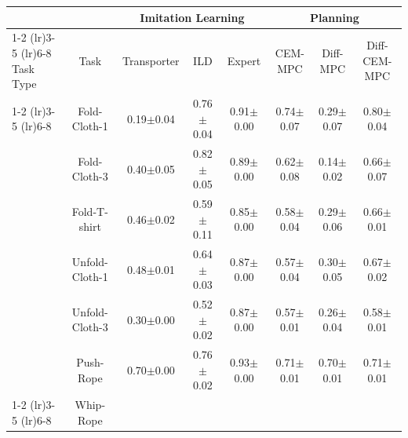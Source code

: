 \begin{table}[t]
\centering
\fontsize{7.5}{7.5}\selectfont
\begin{tabular}{lccccccc}
\toprule
 &  & \multicolumn{3}{c}{Imitation Learning} &  \multicolumn{3}{c}{Planning}\\
 \cmidrule(lr){1-2}
 \cmidrule(lr){3-5} 
\cmidrule(lr){6-8} 
Task Type   
& Task & Transporter & ILD & Expert
 & CEM-MPC & Diff-MPC & Diff-CEM-MPC\\
\cmidrule(lr){1-2}
\cmidrule(lr){3-5} 
\cmidrule(lr){6-8} 
\multirow{6}{*}{High-level} 

& Fold-Cloth-1 

& 0.19$\pm$0.04 & 0.76$\pm$0.04 & 0.91$\pm$0.00

&0.74$\pm$0.07 & 0.29$\pm$0.07 &0.80$\pm$0.04 
\\


& Fold-Cloth-3 

& 0.40$\pm$0.05 &   0.82$\pm$0.05 & 0.89$\pm$0.00

& 0.62$\pm$0.08 & 0.14$\pm$0.02 & 0.66$\pm$0.07 

\\


& Fold-T-shirt 

& 0.46$\pm$0.02 &  0.59$\pm$0.11 & 0.85$\pm$0.00 

& 0.58$\pm$0.04 & 0.29$\pm$0.06 & 0.66$\pm$0.01

\\


& Unfold-Cloth-1 

 &0.48$\pm$0.01 & 0.64$\pm$0.03 & 0.87$\pm$0.00
 
 &  0.57$\pm$0.04 & 0.30$\pm$0.05 & 0.67$\pm$0.02  


\\


&Unfold-Cloth-3 

 & 0.30$\pm$0.00 & 0.52$\pm$0.02 &0.87$\pm$0.00
 
 & 0.57$\pm$0.01 & 0.26$\pm$0.04 & 0.58$\pm$0.01 

\\

& Push-Rope

&  0.70$\pm$0.00 & 0.76$\pm$0.02 & 0.93$\pm$0.00 

& 0.71$\pm$0.01 & 0.70$\pm$0.01 &0.71$\pm$0.01  

\\
\cmidrule(lr){1-2}
\cmidrule(lr){3-5} 
\cmidrule(lr){6-8}
\multirow{3}{*}{Low-level}

&Whip-Rope 


\end{tabular}
\end{table}
